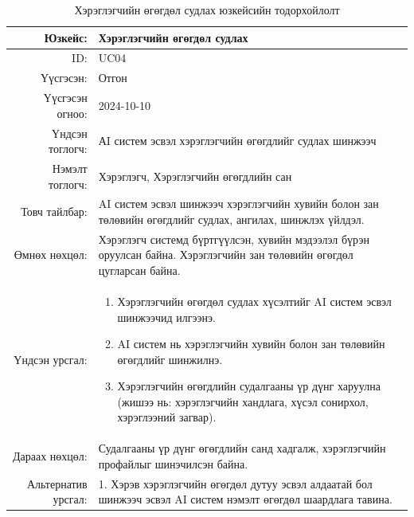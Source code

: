 \begin{longtable}{|r|p{11.5cm}|}
    \caption{Хэрэглэгчийн өгөгдөл судлах юзкейсийн тодорхойлолт} 
    \label{table:songolt3}\\ \hline
    {Юзкейс:} & {Хэрэглэгчийн өгөгдөл судлах}\\ \hline
    {ID:} & {UC04}\\ \hline
    {Үүсгэсэн:} & {Отгон }\\ \hline
    {Үүсгэсэн огноо:} & {2024-10-10}\\ \hline
    {Үндсэн тоглогч:} & {АI систем эсвэл хэрэглэгчийн өгөгдлийг судлах шинжээч}\\ \hline
    {Нэмэлт тоглогч:} & {Хэрэглэгч, Хэрэглэгчийн өгөгдлийн сан}\\ \hline
    {Товч тайлбар:} & {AI систем эсвэл шинжээч хэрэглэгчийн хувийн болон зан төлөвийн өгөгдлийг судлах, ангилах, шинжлэх үйлдэл.}\\ \hline
    {Өмнөх нөхцөл:} & {Хэрэглэгч системд бүртгүүлсэн, хувийн мэдээлэл бүрэн оруулсан байна. Хэрэглэгчийн зан төлөвийн өгөгдөл цугларсан байна.}\\ \hline
    {Үндсэн урсгал:} & {\begin{enumerate}
        \item Хэрэглэгчийн өгөгдөл судлах хүсэлтийг AI систем эсвэл шинжээчид илгээнэ.
    \item AI систем нь хэрэглэгчийн хувийн болон зан төлөвийн өгөгдлийг шинжилнэ.
    \item Хэрэглэгчийн өгөгдлийн судалгааны үр дүнг харуулна (жишээ нь: хэрэглэгчийн хандлага, хүсэл сонирхол, хэрэглээний загвар).\end{enumerate}}\\ \hline
    {Дараах нөхцөл:} & {Судалгааны үр дүнг өгөгдлийн санд хадгалж, хэрэглэгчийн профайлыг шинэчилсэн байна.}\\ \hline
    {Альтернатив урсгал:} & {1. Хэрэв хэрэглэгчийн өгөгдөл дутуу эсвэл алдаатай бол шинжээч эсвэл AI систем нэмэлт өгөгдөл шаардлага тавина.}\\ \hline
\end{longtable}
\newpage
